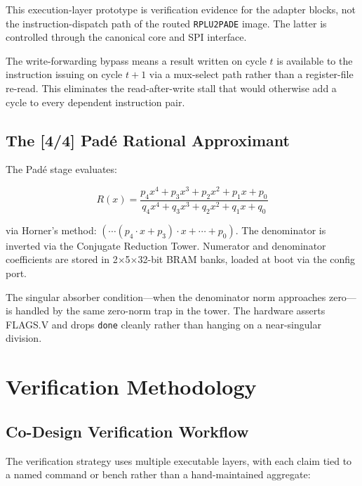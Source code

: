 \documentclass[conference]{IEEEtran}
\begin{document}
This execution-layer prototype is verification evidence for the adapter
blocks, not the instruction-dispatch path of the routed
\texttt{RPLU2PADE} image. The latter is controlled through the canonical core
and SPI interface.

The write-forwarding bypass means a result written on cycle $t$ is
available to the instruction issuing on cycle $t+1$ via a mux-select path
rather than a register-file re-read. This eliminates the read-after-write
stall that would otherwise add a cycle to every dependent instruction pair.

\subsection{The [4/4] Pad\'{e} Rational Approximant}

The Pad\'{e} stage evaluates:

\begin{equation}
R(x) = \frac{p_4 x^4 + p_3 x^3 + p_2 x^2 + p_1 x + p_0}
            {q_4 x^4 + q_3 x^3 + q_2 x^2 + q_1 x + q_0}
\end{equation}

via Horner's method: $(\cdots(p_4 \cdot x + p_3) \cdot x + \cdots + p_0)$.
The denominator is inverted via the Conjugate Reduction Tower. Numerator
and denominator coefficients are stored in 2$\times$5$\times$32-bit BRAM
banks, loaded at boot via the config port.

The singular absorber condition---when the denominator norm approaches
zero---is handled by the same zero-norm trap in the tower. The hardware
asserts FLAGS.V and drops \texttt{done} cleanly rather than hanging on a
near-singular division.


\section{Verification Methodology}
\label{sec:verification}

\subsection{Co-Design Verification Workflow}

The verification strategy uses multiple executable layers, with each claim
tied to a named command or bench rather than a hand-maintained aggregate:
\end{document}

